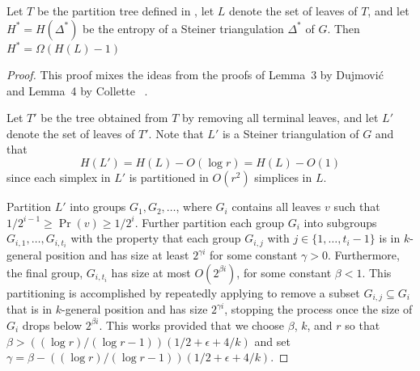 \documentclass{patmorin}
\begin{document}
\begin{lem}
  Let $T$ be the partition tree defined in ,
  let $L$ denote the set of leaves of $T$, and let $H^*=H(\Delta^*)$ be
  the entropy of a Steiner triangulation $\Delta^*$ of $G$.  Then $H^*
  = \Omega(H(L)-1)$
\end{lem}

\begin{proof}
  This proof mixes the ideas from the proofs of Lemma~3 by Dujmovi\'c
  \etal\ \cite{dhm09} and Lemma~4 by Collette \etal\ \cite{cdilm08}.

  Let $T'$ be the tree obtained from $T$ by removing all terminal leaves,
  and let $L'$ denote the set of leaves of $T'$.  Note that $L'$ is a Steiner
  triangulation of $G$ and that 
  \[  
     H(L') = H(L) - O(\log r) = H(L) - O(1)
  \]
  since each simplex in $L'$ is partitioned in $O(r^2)$ simplices in $L$. 

  Partition $L'$ into groups $G_1,G_2,\ldots$, where $G_i$
  contains all leaves $v$ such that $1/2^{i-1} \ge \Pr(v) \ge
  1/2^{i}$.  Further partition each group $G_i$ into subgroups
  $G_{i,1},\ldots,G_{i,t_i}$ with the property that each group $G_{i,j}$
  with $j\in\{1,\ldots,t_i-1\}$ is in $k$-general position and has size
  at least $2^{\gamma i}$ for some constant $\gamma > 0$. Furthermore,
  the final group, $G_{i,t_i}$ has size at most $O(2^{\beta i})$, for some
  constant $\beta < 1$.  This partitioning is accomplished by repeatedly
  applying  to remove a subset $G_{i,j}\subseteq
  G_{i}$ that is in $k$-general position and has size $2^{\gamma i}$,
  stopping the process once the size of $G_i$ drops below $2^{\beta
  i}$. This works provided that we choose $\beta$, $k$, and $r$ so
  that $\beta > ((\log r)/(\log r - 1))(1/2+\epsilon+4/k)$ and set
  $\gamma=\beta - ((\log r)/(\log r - 1))(1/2+\epsilon+4/k)$.


\end{proof}
\end{document}
